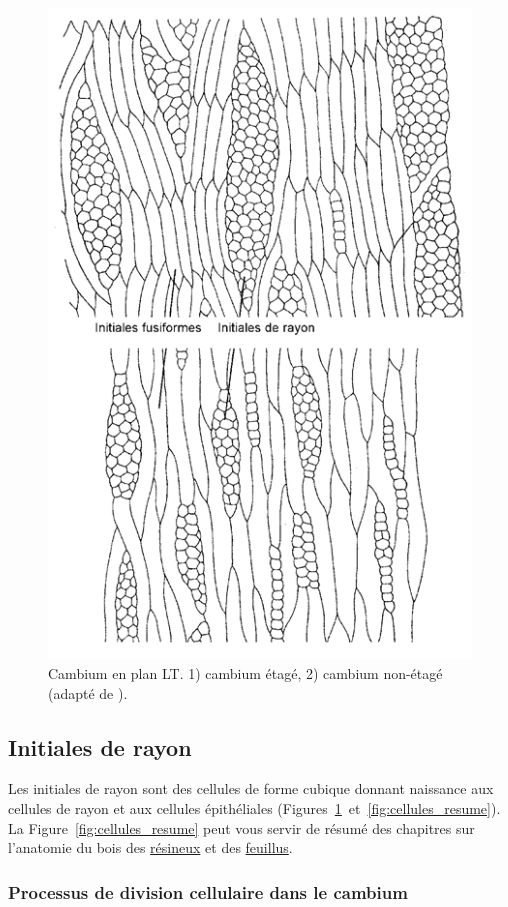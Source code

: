 \begin{figure}[h]
	\centering
	\includegraphics[scale=0.4]{img/ch5_cambium_etage}
	\caption{Cambium en plan LT.  1) cambium étagé, 2) cambium non-étagé (adapté de \cite{fahn1990plant}).}
\label{fig:cambium_etage}
\end{figure}

\subsection{Initiales de rayon}

Les initiales de rayon sont des cellules de forme cubique donnant naissance aux cellules de rayon et aux cellules épithéliales (Figures~\ref{fig:cambium_etage}~et~\ref{fig:cellules_resume}). La Figure~\ref{fig:cellules_resume} peut vous servir de résumé des chapitres sur l'anatomie du bois des \hyperref[resineux]{résineux} et des \hyperref[feuillus]{feuillus}.

\subsubsection{Processus de division cellulaire dans le cambium}

